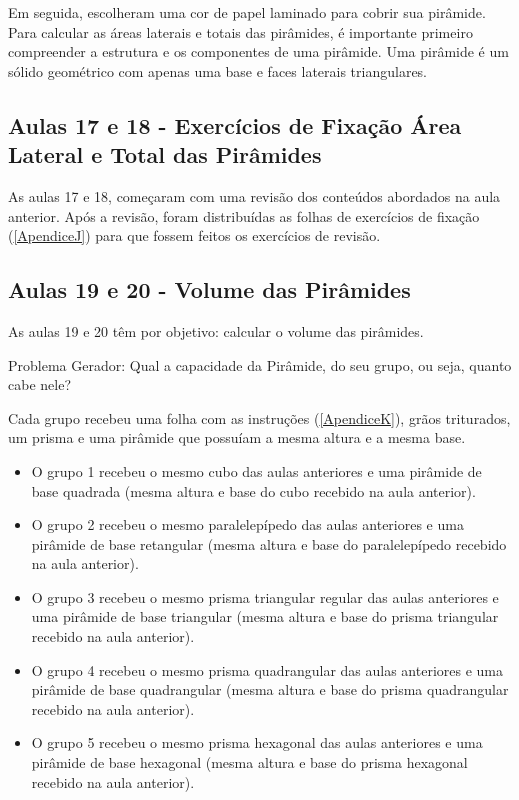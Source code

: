 Em seguida, escolheram uma cor de papel laminado para cobrir sua pirâmide. Para calcular as áreas laterais e totais das pirâmides, é importante primeiro compreender a estrutura e os componentes de uma pirâmide. Uma pirâmide é um sólido geométrico com apenas uma base e faces laterais triangulares.

\subsection{Aulas 17 e 18 - Exercícios de Fixação Área Lateral e Total das Pirâmides}

As aulas 17 e 18, começaram com uma revisão dos conteúdos abordados na aula anterior. Após a revisão, foram distribuídas as folhas de exercícios de fixação (\autoref{ApendiceJ}) para que fossem feitos os exercícios de revisão.

\subsection{Aulas 19 e 20 - Volume das Pirâmides}

As aulas 19 e 20 têm por objetivo: calcular o volume das pirâmides.

Problema Gerador: Qual a capacidade da Pirâmide, do seu grupo, ou seja, quanto cabe nele?

Cada grupo recebeu uma folha com as instruções (\autoref{ApendiceK}), grãos triturados, um prisma e uma pirâmide que possuíam a mesma altura e a mesma base.

\begin{itemize}
    \item O grupo 1 recebeu o mesmo cubo das aulas anteriores e uma pirâmide de base quadrada (mesma altura e base do cubo recebido na aula anterior).
    \item O grupo 2 recebeu o mesmo paralelepípedo das aulas anteriores e uma pirâmide de base retangular (mesma altura e base do paralelepípedo recebido na aula anterior).
    \item O grupo 3 recebeu o mesmo prisma triangular regular das aulas anteriores e uma pirâmide de base triangular (mesma altura e base do prisma triangular recebido na aula anterior).
    \item O grupo 4 recebeu o mesmo prisma quadrangular das aulas anteriores e uma pirâmide de base quadrangular (mesma altura e base do prisma quadrangular recebido na aula anterior).
    \item O grupo 5 recebeu o mesmo prisma hexagonal das aulas anteriores e uma pirâmide de base hexagonal (mesma altura e base do prisma hexagonal recebido na aula anterior).
\end{itemize}

